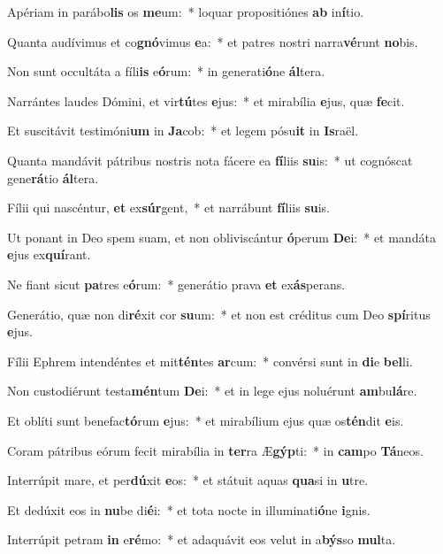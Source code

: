 \item Apériam in parábo\textbf{lis} os \textbf{me}um:~* loquar propositiónes \textbf{ab} in\textbf{í}tio.
\item Quanta audívimus et co\textbf{gnó}vimus \textbf{e}a:~* et patres nostri narra\textbf{vé}runt \textbf{no}bis.
\item Non sunt occultáta a fíli\textbf{is} e\textbf{ó}rum:~* in generati\textbf{ó}ne \textbf{ál}tera.
\item Narrántes laudes Dómini, et vir\textbf{tú}tes \textbf{e}jus:~* et mirabília \textbf{e}jus, quæ \textbf{fe}cit.
\item Et suscitávit testimóni\textbf{um} in \textbf{Ja}cob:~* et legem pósu\textbf{it} in \textbf{Is}raël.
\item Quanta mandávit pátribus nostris nota fácere ea \textbf{fí}liis \textbf{su}is:~* ut cognóscat gene\textbf{rá}tio \textbf{ál}tera.
\item Fílii qui nascéntur, \textbf{et} ex\textbf{súr}gent,~* et narrábunt \textbf{fí}liis \textbf{su}is.
\item Ut ponant in Deo spem suam, et non obliviscántur \textbf{ó}perum \textbf{De}i:~* et mandáta \textbf{e}jus ex\textbf{quí}rant.
\item Ne fiant sicut \textbf{pa}tres e\textbf{ó}rum:~* generátio prava \textbf{et} ex\textbf{ás}perans.
\item Generátio, quæ non di\textbf{ré}xit cor \textbf{su}um:~* et non est créditus cum Deo \textbf{spí}ritus \textbf{e}jus.
\item Fílii Ephrem intendéntes et mit\textbf{tén}tes \textbf{ar}cum:~* convérsi sunt in \textbf{di}e \textbf{bel}li.
\item Non custodiérunt testa\textbf{mén}tum \textbf{De}i:~* et in lege ejus noluérunt \textbf{am}bu\textbf{lá}re.
\item Et oblíti sunt benefac\textbf{tó}rum \textbf{e}jus:~* et mirabílium ejus quæ os\textbf{tén}dit \textbf{e}is.
\item Coram pátribus eórum fecit mirabília in \textbf{ter}ra Æ\textbf{gýp}ti:~* in \textbf{cam}po \textbf{Tá}neos.
\item Interrúpit mare, et per\textbf{dú}xit \textbf{e}os:~* et státuit aquas \textbf{qua}si in \textbf{u}tre.
\item Et dedúxit eos in \textbf{nu}be di\textbf{é}i:~* et tota nocte in illuminati\textbf{ó}ne \textbf{i}gnis.
\item Interrúpit petram \textbf{in} e\textbf{ré}mo:~* et adaquávit eos velut in a\textbf{býs}so \textbf{mul}ta.

